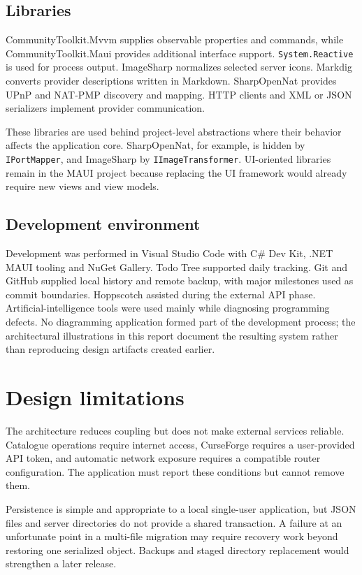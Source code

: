 \subsection{Libraries}

CommunityToolkit.Mvvm supplies observable properties and commands, while CommunityToolkit.Maui provides additional interface support. \texttt{System.Reactive} is used for process output. ImageSharp normalizes selected server icons. Markdig converts provider descriptions written in Markdown. SharpOpenNat provides UPnP and NAT-PMP discovery and mapping. HTTP clients and XML or JSON serializers implement provider communication.

These libraries are used behind project-level abstractions where their behavior affects the application core. SharpOpenNat, for example, is hidden by \texttt{IPortMapper}, and ImageSharp by \texttt{IImageTransformer}. UI-oriented libraries remain in the MAUI project because replacing the UI framework would already require new views and view models.

\subsection{Development environment}

Development was performed in Visual Studio Code with C\# Dev Kit, .NET MAUI tooling and NuGet Gallery. Todo Tree supported daily tracking. Git and GitHub supplied local history and remote backup, with major milestones used as commit boundaries. Hoppscotch assisted during the external API phase. Artificial-intelligence tools were used mainly while diagnosing programming defects. No diagramming application formed part of the development process; the architectural illustrations in this report document the resulting system rather than reproducing design artifacts created earlier.

\section{Design limitations}

The architecture reduces coupling but does not make external services reliable. Catalogue operations require internet access, CurseForge requires a user-provided API token, and automatic network exposure requires a compatible router configuration. The application must report these conditions but cannot remove them.

Persistence is simple and appropriate to a local single-user application, but JSON files and server directories do not provide a shared transaction. A failure at an unfortunate point in a multi-file migration may require recovery work beyond restoring one serialized object. Backups and staged directory replacement would strengthen a later release.
